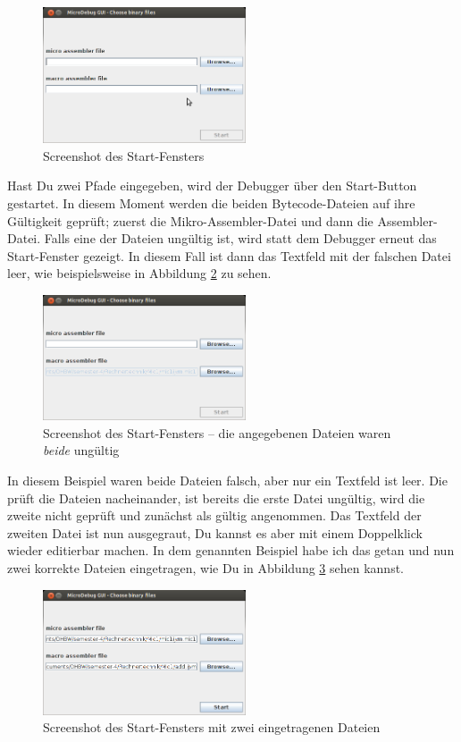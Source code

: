\begin{figure}[h]
	\centering
	\includegraphics[width=6cm]{images/start-frame-empty}
	\caption{Screenshot des Start-Fensters}
	\label{fig:start-frame-empty}
\end{figure}

Hast Du zwei Pfade eingegeben, wird der Debugger über den Start-Button gestartet. In diesem Moment werden die beiden Bytecode-Dateien auf ihre Gültigkeit geprüft; zuerst die Mikro-Assembler-Datei und dann die Assembler-Datei. Falls eine der Dateien ungültig ist, wird statt dem Debugger erneut das Start-Fenster gezeigt. In diesem Fall ist dann das Textfeld mit der falschen Datei leer, wie beispielsweise in Abbildung \ref{fig:start-frame-both-wrong} zu sehen.

\begin{figure}[h]
	\centering
	\includegraphics[width=6cm]{images/start-frame-both-wrong}
	\caption{Screenshot des Start-Fensters -- die angegebenen Dateien waren \emph{beide} ungültig}
	\label{fig:start-frame-both-wrong}
\end{figure}

In diesem Beispiel waren beide Dateien falsch, aber nur ein Textfeld ist leer. Die \mdg{} prüft die Dateien nacheinander, ist bereits die erste Datei ungültig, wird die zweite nicht geprüft und zunächst als gültig angenommen. Das Textfeld der zweiten Datei ist nun ausgegraut, Du kannst es aber mit einem Doppelklick wieder editierbar machen. In dem genannten Beispiel habe ich das getan und nun zwei korrekte Dateien eingetragen, wie Du in Abbildung \ref{fig:start-frame-both-filled} sehen kannst.

\begin{figure}[h]
	\centering
	\includegraphics[width=6cm]{images/start-frame-both-filled}
	\caption{Screenshot des Start-Fensters mit zwei eingetragenen Dateien}
	\label{fig:start-frame-both-filled}
\end{figure}


